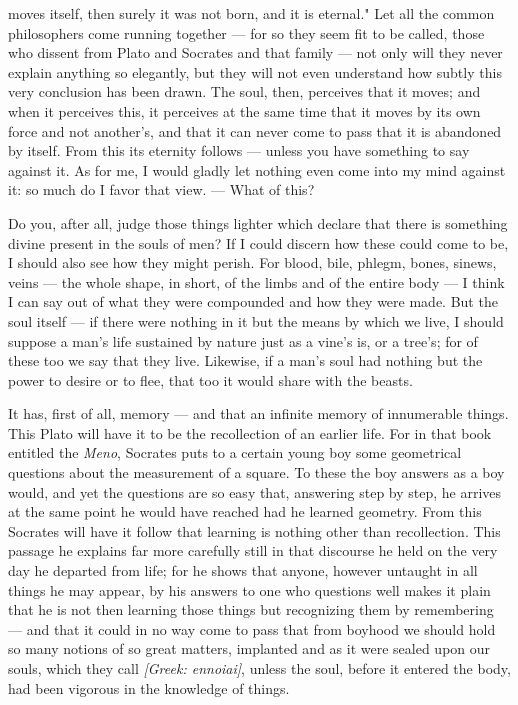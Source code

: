  moves itself, then surely it was not born, and it is eternal." Let all the common philosophers come running together — for so they seem fit to be called, those who dissent from Plato and Socrates and that family — not only will they never explain anything so elegantly, but they will not even understand how subtly this very conclusion has been drawn. The soul, then, perceives that it moves; and when it perceives this, it perceives at the same time that it moves by its own force and not another's, and that it can never come to pass that it is abandoned by itself. From this its eternity follows — unless you have something to say against it. As for me, I would gladly let nothing even come into my mind against it: so much do I favor that view. — What of this?

 Do you, after all, judge those things lighter which declare that there is something divine present in the souls of men? If I could discern how these could come to be, I should also see how they might perish. For blood, bile, phlegm, bones, sinews, veins — the whole shape, in short, of the limbs and of the entire body — I think I can say out of what they were compounded and how they were made. But the soul itself — if there were nothing in it but the means by which we live, I should suppose a man's life sustained by nature just as a vine's is, or a tree's; for of these too we say that they live. Likewise, if a man's soul had nothing but the power to desire or to flee, that too it would share with the beasts.

 It has, first of all, memory — and that an infinite memory of innumerable things. This Plato will have it to be the recollection of an earlier life. For in that book entitled the \textit{Meno}, Socrates puts to a certain young boy some geometrical questions about the measurement of a square. To these the boy answers as a boy would, and yet the questions are so easy that, answering step by step, he arrives at the same point he would have reached had he learned geometry. From this Socrates will have it follow that learning is nothing other than recollection. This passage he explains far more carefully still in that discourse he held on the very day he departed from life; for he shows that anyone, however untaught in all things he may appear, by his answers to one who questions well makes it plain that he is not then learning those things but recognizing them by remembering — and that it could in no way come to pass that from boyhood we should hold so many notions of so great matters, implanted and as it were sealed upon our souls, which they call \textit{[Greek: ennoiai]}, unless the soul, before it entered the body, had been vigorous in the knowledge of things.

